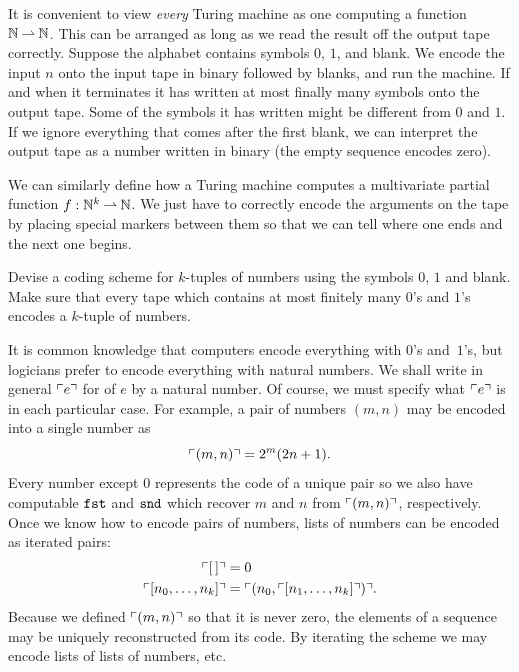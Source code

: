 It is convenient to view \emph{every} Turing machine as one computing a
function $\mathbb{N} \mathbin{\rightharpoonup} \mathbb{N}$. This can be arranged as long as we read the
result off the output tape correctly. Suppose the alphabet contains
symbols $0$, $1$, and blank. We encode the input $n$ onto the input
tape in binary followed by blanks, and run the machine. If and when it
terminates it has written at most finally many symbols onto the output
tape. Some of the symbols it has written might be different from $0$
and $1$. If we ignore everything that comes after the first blank, we
can interpret the output tape as a number written in binary (the empty
sequence encodes zero).

We can similarly define how a Turing machine computes a multivariate
partial function $f : \mathbb{N}^k \mathbin{\rightharpoonup} \mathbb{N}$. We just have to correctly
encode the arguments on the tape by placing special markers between
them so that we can tell where one ends and the next one begins.

\begin{exercise}
  Devise a coding scheme for $k$-tuples of numbers using the symbols $0$, $1$ and blank. Make sure that every tape which contains at most finitely many $0$'s and $1$'s encodes a $k$-tuple of numbers.
\end{exercise}

It is common knowledge that computers encode everything with $0$'s and~$1$'s, but logicians prefer to encode everything with natural numbers.
We shall write in general $\ulcorner e \urcorner$ for  of $e$ by a natural
number. Of course, we must specify what $\ulcorner e \urcorner$ is in each
particular case. For example, a pair of numbers $(m, n)$ may be
encoded into a single number as
%
\begin{equation*}
  \ulcorner (m, n) \urcorner = 2^m (2 n + 1).
\end{equation*}
%
Every number except $0$ represents the code of a unique pair so we
also have computable  $\mathtt{fst}$ and $\mathtt{snd}$ which
recover $m$ and $n$ from $\ulcorner (m, n) \urcorner$, respectively.
Once we know how to encode pairs of numbers, lists of numbers can be encoded as iterated pairs:
%
\begin{align*}
  \ulcorner [\,] \urcorner &= 0 \\
  \ulcorner [n_0, \ldots, n_k] \urcorner &= \ulcorner (n_0, \ulcorner [n_1, \ldots, n_k] \urcorner) \urcorner.
\end{align*}
%
Because we defined $\ulcorner (m,n) \urcorner$ so that it is never zero, the
elements of a sequence may be uniquely reconstructed from its code.
By iterating the scheme we may encode lists of lists of numbers, etc.

